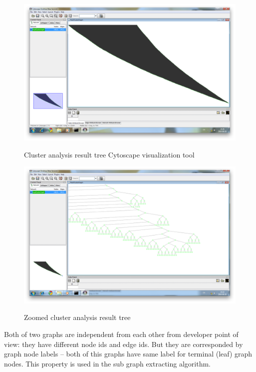 \documentclass[a4paper,oneside]{article}
\begin{document}
\begin{figure}[h]
\begin{center}
	\includegraphics[scale=0.3]{pictures/Cytoscape_cluster_graph_1.png}
	\label{Cytoscape_Cluster_1}
	\caption{Cluster analysis result tree Cytoscape visualization tool}
\end{center}
\end{figure}

\begin{figure}[h]
\begin{center}
	\includegraphics[scale=0.3]{pictures/Cytoscape_cluster_graph_2.png}
	\label{Cytoscape_Cluster_2}
	\caption{Zoomed cluster analysis result tree}
\end{center}
\end{figure}

Both of two graphs are independent from each other from developer point of view: they have different node ids and edge ids. But they are corresponded by graph node labels -- both of this graphs have same label for terminal (leaf) graph nodes. This property is used in the sub graph extracting algorithm.
\end{document}

